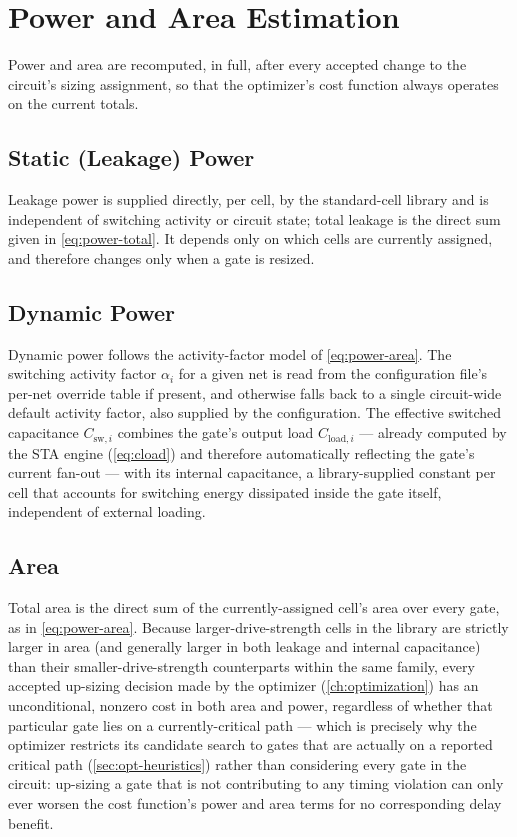 \chapter{Power and Area Estimation}
\label{ch:power-area}

Power and area are recomputed, in full, after every accepted change to the
circuit's sizing assignment, so that the
optimizer's cost function always operates on the
current totals.

\section{Static (Leakage) Power}
\label{sec:pa-leakage}

Leakage power is supplied directly, per cell, by the standard-cell library
and is independent of switching activity or circuit state; total leakage is
the direct sum given in \cref{eq:power-total}. It depends only on which
cells are currently assigned, and therefore changes only when a gate is
resized.

\section{Dynamic Power}
\label{sec:pa-dynamic}

Dynamic power follows the activity-factor model of \cref{eq:power-area}. The
switching activity factor $\alpha_i$ for a given net is read from the
configuration file's per-net override table if present, and otherwise
falls back to a single circuit-wide default activity factor, also supplied
by the configuration. The effective switched capacitance
$C_{\mathrm{sw},i}$ combines the gate's output load $C_{\mathrm{load},i}$
--- already computed by the STA engine (\cref{eq:cload}) and therefore
automatically reflecting the gate's current fan-out --- with its internal
capacitance, a library-supplied constant per cell that accounts for
switching energy dissipated inside the gate itself, independent of external
loading.

\section{Area}
\label{sec:pa-area}

Total area is the direct sum of the currently-assigned cell's area over
every gate, as in \cref{eq:power-area}. Because larger-drive-strength cells
in the library are strictly larger in area (and generally larger in both
leakage and internal capacitance) than their smaller-drive-strength
counterparts within the same family, every accepted up-sizing decision made
by the optimizer (\cref{ch:optimization}) has an unconditional, nonzero
cost in both area and power, regardless of whether that particular gate
lies on a currently-critical path --- which is precisely why the optimizer
restricts its candidate search to gates that are actually on a reported
critical path (\cref{sec:opt-heuristics}) rather than considering every gate
in the circuit: up-sizing a gate that is not contributing to any timing
violation can only ever worsen the cost function's power and area terms for
no corresponding delay benefit.
